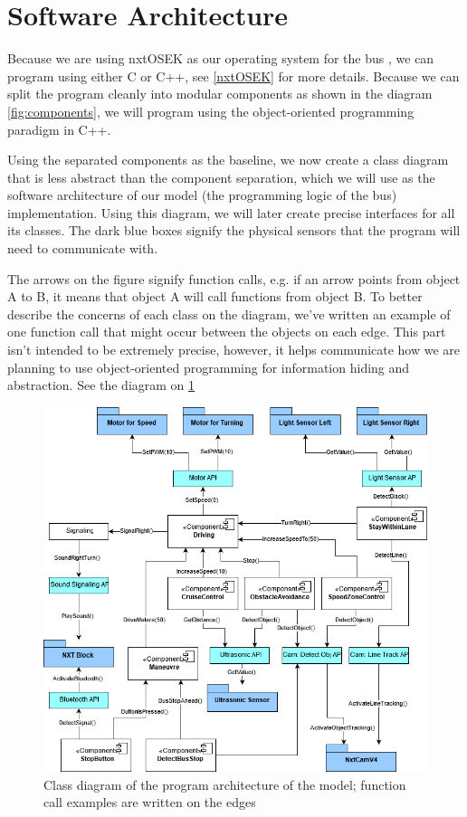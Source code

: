 
\section{Software Architecture}
Because we are using nxtOSEK as our operating system for the bus , we can program using either C or C++, see \ref{nxtOSEK} for more details. Because we can split the program cleanly into modular components as shown in the diagram \ref{fig:components}, we will program using the object-oriented programming paradigm in C++. 

Using the separated components as the baseline, we now create a class diagram that is less abstract than the component separation, which we will use as the software architecture of our model (the programming logic of the bus) implementation. Using this diagram, we will later create precise interfaces for all its classes. The dark blue boxes signify the physical sensors that the program will need to communicate with. 

The arrows on the figure signify function calls, e.g. if an arrow points from object A to B, it means that object A will call functions from object B. To better describe the concerns of each class on the diagram, we've written an example of one function call that might occur between the objects on each edge. This part isn't intended to be extremely precise, however, it helps communicate how we are planning to use object-oriented programming for information hiding and abstraction. See the diagram on \ref{fig:softwareArchitecture}

\begin{figure}[ht]
    \includegraphics[width=\textwidth]{Images/Design/architectureClassDiagram.png}
    \caption{Class diagram of the program architecture of the model; function call examples are written on the edges}
    \label{fig:softwareArchitecture}
\end{figure}

